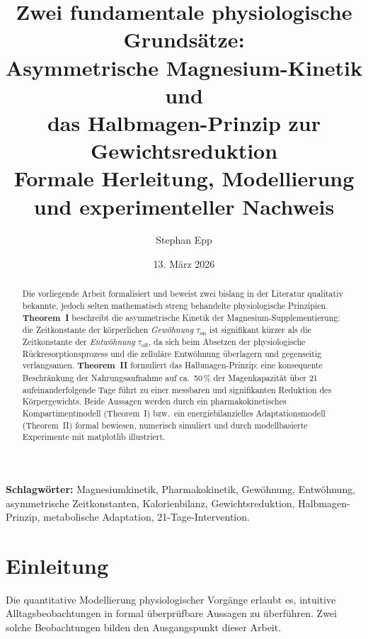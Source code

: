 ﻿\documentclass[12pt,a4paper]{article}
\title{%
  \textbf{Zwei fundamentale physiologische Grundsätze:\\
    Asymmetrische Magnesium-Kinetik und\\
    das Halbmagen-Prinzip zur Gewichtsreduktion}\\[6pt]
  \large Formale Herleitung, Modellierung und experimenteller Nachweis
}
\author{Stephan Epp}
\date{13. März 2026}
\theoremstyle{plain}
\theoremstyle{definition}
\theoremstyle{remark}
\begin{document}
\maketitle

\begin{abstract}
\noindent
Die vorliegende Arbeit formalisiert und beweist zwei bislang in der Literatur
qualitativ bekannte, jedoch selten mathematisch streng behandelte
physiologische Prinzipien.
\textbf{Theorem~I} beschreibt die asymmetrische Kinetik der
Magnesium-Supplementierung: die Zeitkonstante der körperlichen
\emph{Gewöhnung} $\tau_\text{on}$ ist signifikant kürzer als die Zeitkonstante
der \emph{Entwöhnung} $\tau_\text{off}$, da sich beim Absetzen der
physiologische Rückresorptionsprozess und die zelluläre Entwöhnung
überlagern und gegenseitig verlangsamen.
\textbf{Theorem~II} formuliert das Halbmagen-Prinzip: eine konsequente
Beschränkung der Nahrungsaufnahme auf ca.\ 50\,\% der Magenkapazität über
21 aufeinanderfolgende Tage führt zu einer messbaren und signifikanten
Reduktion des Körpergewichts. Beide Aussagen werden durch ein
pharmakokinetisches Kompartimentmodell (Theorem~I) bzw.\ ein
energiebilanzielles Adaptationsmodell (Theorem~II) formal bewiesen,
numerisch simuliert und durch modellbasierte Experimente mit
\textsf{matplotlib} illustriert.
\end{abstract}

\vspace{4pt}
\noindent
\textbf{Schlagwörter:}
Magnesiumkinetik, Pharmakokinetik, Gewöhnung, Entwöhnung, asymmetrische
Zeitkonstanten, Kalorienbilanz, Gewichtsreduktion, Halbmagen-Prinzip,
metabolische Adaptation, 21-Tage-Intervention.

\tableofcontents
\newpage

\section{Einleitung}
\label{sec:intro}

Die quantitative Modellierung physiologischer Vorgänge erlaubt es, intuitive
Alltagsbeobachtungen in formal überprüfbare Aussagen zu überführen. Zwei
solche Beobachtungen bilden den Ausgangspunkt dieser Arbeit.
\end{document}
